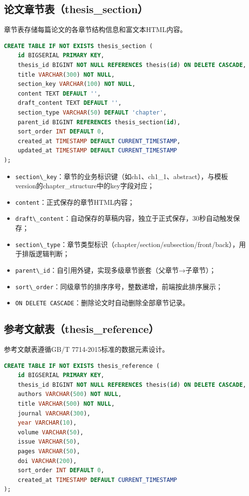 \documentclass{../../softeng}
\begin{document}
\subsection{论文章节表（thesis\_section）}

章节表存储每篇论文的各章节结构信息和富文本HTML内容。

\begin{lstlisting}[language=SQL,caption={thesis\_section 建表语句}]
CREATE TABLE IF NOT EXISTS thesis_section (
    id BIGSERIAL PRIMARY KEY,
    thesis_id BIGINT NOT NULL REFERENCES thesis(id) ON DELETE CASCADE,
    title VARCHAR(300) NOT NULL,
    section_key VARCHAR(100) NOT NULL,
    content TEXT DEFAULT '',
    draft_content TEXT DEFAULT '',
    section_type VARCHAR(50) DEFAULT 'chapter',
    parent_id BIGINT REFERENCES thesis_section(id),
    sort_order INT DEFAULT 0,
    created_at TIMESTAMP DEFAULT CURRENT_TIMESTAMP,
    updated_at TIMESTAMP DEFAULT CURRENT_TIMESTAMP
);
\end{lstlisting}

\begin{itemize}
    \item \verb|section\_key|：章节的业务标识键（如ch1、ch1\_1、abstract），与模板version的chapter\_structure中的key字段对应；
    \item \verb|content|：正式保存的章节HTML内容；
    \item \verb|draft\_content|：自动保存的草稿内容，独立于正式保存，30秒自动触发保存；
    \item \verb|section\_type|：章节类型标识（chapter/section/subsection/front/back），用于排版逻辑判断；
    \item \verb|parent\_id|：自引用外键，实现多级章节嵌套（父章节→子章节）；
    \item \verb|sort\_order|：同级章节的排序序号，整数递增，前端按此排序展示；
    \item \verb|ON DELETE CASCADE|：删除论文时自动删除全部章节记录。
\end{itemize}

\subsection{参考文献表（thesis\_reference）}

参考文献表遵循GB/T 7714-2015标准的数据元素设计。

\begin{lstlisting}[language=SQL,caption={thesis\_reference 建表语句}]
CREATE TABLE IF NOT EXISTS thesis_reference (
    id BIGSERIAL PRIMARY KEY,
    thesis_id BIGINT NOT NULL REFERENCES thesis(id) ON DELETE CASCADE,
    authors VARCHAR(500) NOT NULL,
    title VARCHAR(500) NOT NULL,
    journal VARCHAR(300),
    year VARCHAR(10),
    volume VARCHAR(50),
    issue VARCHAR(50),
    pages VARCHAR(50),
    doi VARCHAR(200),
    sort_order INT DEFAULT 0,
    created_at TIMESTAMP DEFAULT CURRENT_TIMESTAMP
);
\end{lstlisting}
\end{document}

